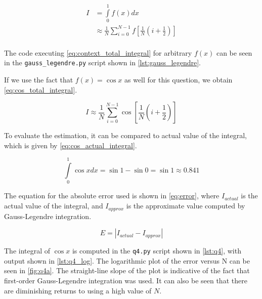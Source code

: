 \documentclass[a4paper,titlepage]{article}
\newcommand{\code}[1]{\texttt{#1}}
\begin{document}
	\begin{equation} \label{eq:context_total_integral}
		\begin{split}
			I &= \int\limits_{0}^{1} f(x) dx  \\
			&\approx \frac{1}{N} \sum_{i=0}^{N-1} f\left[ \frac{1}{N} \left(i + \frac{1}{2} \right) \right] \\
		\end{split}
	\end{equation}
	
	The code executing \cref{eq:context_total_integral} for arbitrary $f(x)$ can be seen in the \code{gauss\_legendre.py} script shown in \cref{lst:gauss_legendre}.
	
	If we use the fact that $f(x) = \cos x$ as well for this question, we obtain \cref{eq:cos_total_integral}.
	
	\begin{equation} \label{eq:cos_total_integral}
		I \approx \frac{1}{N} \sum_{i=0}^{N-1} \cos \left[ \frac{1}{N} \left(i + \frac{1}{2} \right) \right]
	\end{equation}
	
	To evaluate the estimation, it can be compared to actual value of the integral, which is given by \cref{eq:cos_actual_integral}.
	
	\begin{equation} \label{eq:cos_actual_integral}
		\int\limits_{0}^{1} \cos x dx = \sin 1 - \sin 0 = \sin 1 \approx 0.841
	\end{equation}
	
	The equation for the absolute error used is shown in \cref{eq:error}, where $I_{actual}$ is the actual value of the integral, and $I_{approx}$ is the approximate value computed by Gauss-Legendre integration.
	
	\begin{equation} \label{eq:error}
		E = | I_{actual}  - I_{approx}|
	\end{equation}
	
 	The integral of $\cos x$ is computed in the \code{q4.py} script shown in \cref{lst:q4}, with output shown in \cref{lst:q4_log}. The logarithmic plot of the error versus N can be seen in \cref{fig:q4a}. The straight-line slope of the plot is indicative of the fact that first-order Gauss-Legendre integration was used. It can also be seen that there are diminishing returns to using a high value of $N$.
 	
\end{document}
